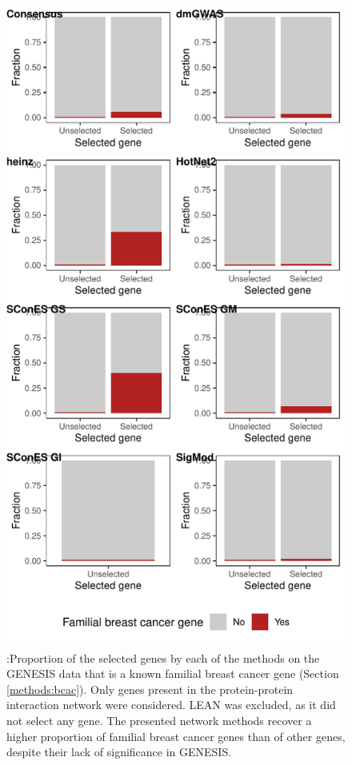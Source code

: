 \documentclass[twocolumn, 10pt]{article}
\begin{document}
\begin{figure}[htbp]
\centering
\includegraphics[width=\textwidth,height=\textheight,keepaspectratio]{./figures/sfigure_5.pdf}
\caption{\label{sfig:disgenet_comparison}
:Proportion of the selected genes by each of the methods on the GENESIS data that is a known familial breast cancer gene (Section \ref{methods:bcac}). Only genes present in the protein-protein interaction network were considered. LEAN was excluded, as it did not select any gene. The presented network methods recover a higher proportion of familial breast cancer genes than of other genes, despite their lack of significance in GENESIS.}
\end{figure}
\end{document}
